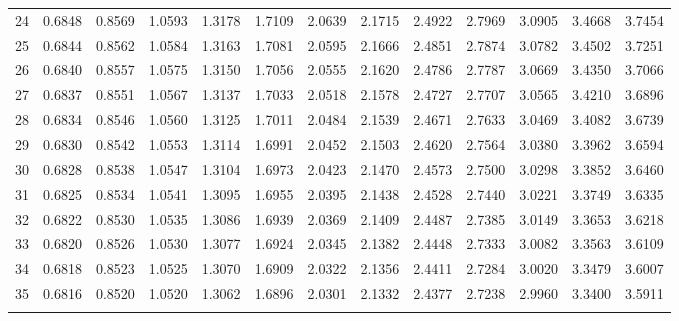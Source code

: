 {\begin{tabular}{m{6pt}|m{24pt}*{11}{m{24pt}}}
 24 & 0.6848 & 0.8569 & 1.0593 & 1.3178 & 1.7109 & 2.0639 & 2.1715 & 2.4922 & 2.7969 & 3.0905 & 3.4668 & 3.7454 \\[1pt] \arrayrulecolor{light-gray}\hline\arrayrulecolor{black}  
 25 & 0.6844 & 0.8562 & 1.0584 & 1.3163 & 1.7081 & 2.0595 & 2.1666 & 2.4851 & 2.7874 & 3.0782 & 3.4502 & 3.7251 \\[1pt] \arrayrulecolor{light-gray}\hline\arrayrulecolor{black}  
 26 & 0.6840 & 0.8557 & 1.0575 & 1.3150 & 1.7056 & 2.0555 & 2.1620 & 2.4786 & 2.7787 & 3.0669 & 3.4350 & 3.7066 \\[1pt] \arrayrulecolor{light-gray}\hline\arrayrulecolor{black}  
 27 & 0.6837 & 0.8551 & 1.0567 & 1.3137 & 1.7033 & 2.0518 & 2.1578 & 2.4727 & 2.7707 & 3.0565 & 3.4210 & 3.6896 \\[1pt] \arrayrulecolor{light-gray}\hline\arrayrulecolor{black}  
 28 & 0.6834 & 0.8546 & 1.0560 & 1.3125 & 1.7011 & 2.0484 & 2.1539 & 2.4671 & 2.7633 & 3.0469 & 3.4082 & 3.6739 \\[1pt] \arrayrulecolor{light-gray}\hline\arrayrulecolor{black}  
 29 & 0.6830 & 0.8542 & 1.0553 & 1.3114 & 1.6991 & 2.0452 & 2.1503 & 2.4620 & 2.7564 & 3.0380 & 3.3962 & 3.6594 \\[1pt] \arrayrulecolor{light-gray}\hline\arrayrulecolor{black}  
 30 & 0.6828 & 0.8538 & 1.0547 & 1.3104 & 1.6973 & 2.0423 & 2.1470 & 2.4573 & 2.7500 & 3.0298 & 3.3852 & 3.6460 \\[1pt] \arrayrulecolor{light-gray}\hline\arrayrulecolor{black}  
 31 & 0.6825 & 0.8534 & 1.0541 & 1.3095 & 1.6955 & 2.0395 & 2.1438 & 2.4528 & 2.7440 & 3.0221 & 3.3749 & 3.6335 \\[1pt] \arrayrulecolor{light-gray}\hline\arrayrulecolor{black}  
 32 & 0.6822 & 0.8530 & 1.0535 & 1.3086 & 1.6939 & 2.0369 & 2.1409 & 2.4487 & 2.7385 & 3.0149 & 3.3653 & 3.6218 \\[1pt] \arrayrulecolor{light-gray}\hline\arrayrulecolor{black}  
 33 & 0.6820 & 0.8526 & 1.0530 & 1.3077 & 1.6924 & 2.0345 & 2.1382 & 2.4448 & 2.7333 & 3.0082 & 3.3563 & 3.6109 \\[1pt] \arrayrulecolor{light-gray}\hline\arrayrulecolor{black}  
 34 & 0.6818 & 0.8523 & 1.0525 & 1.3070 & 1.6909 & 2.0322 & 2.1356 & 2.4411 & 2.7284 & 3.0020 & 3.3479 & 3.6007 \\[1pt] \arrayrulecolor{light-gray}\hline\arrayrulecolor{black}  
 35 & 0.6816 & 0.8520 & 1.0520 & 1.3062 & 1.6896 & 2.0301 & 2.1332 & 2.4377 & 2.7238 & 2.9960 & 3.3400 & 3.5911 \\[1pt] \arrayrulecolor{light-gray}\hline\arrayrulecolor{black}  

\end{tabular}}
